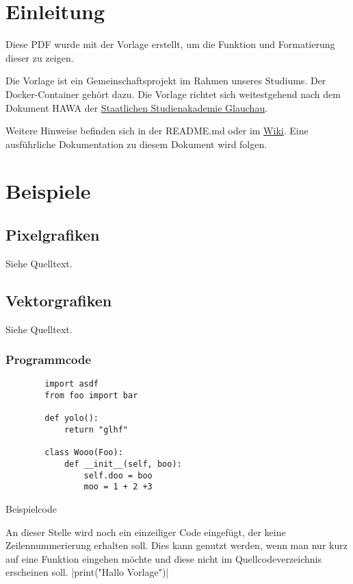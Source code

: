 \section{Einleitung}
Diese PDF wurde mit der Vorlage erstellt, um die Funktion und Formatierung dieser zu zeigen.

Die Vorlage ist ein Gemeinschaftsprojekt im Rahmen unseres Studiums.
Der Docker-Container gehört dazu.
Die Vorlage richtet sich weitestgehend nach dem Dokument \ac{HAWA} der \href{https://www.ba-glauchau.de/}{Staatlichen Studienakademie Glauchau}.

Weitere Hinweise befinden sich in der README.md oder im \href{https://github.com/DSczyrba/Vorlage-Latex/wiki}{Wiki}.
Eine ausführliche Dokumentation zu diesem Dokument wird folgen.

\section{Beispiele}
\label{sec:beispiele}
\subsection{Pixelgrafiken}
Siehe Quelltext.
\subsection{Vektorgrafiken}
Siehe Quelltext.
\subsubsection{Programmcode}
\begin{code}[H]
    \begin{verbatim}
        import asdf
        from foo import bar
        
        def yolo():
            return "glhf"
        
        class Wooo(Foo):
            def __init__(self, boo):
                self.doo = boo
                moo = 1 + 2 +3
    \end{verbatim}
    \caption{Beispielcode}
    \label{code:example}
\end{code}
An dieser Stelle wird noch ein einzeiliger Code eingefügt, der keine Zeilennummerierung erhalten soll.
Dies kann genutzt werden, wenn man nur kurz auf eine Funktion eingehen möchte und diese nicht im Quellcodeverzeichnis erscheinen soll.
|print("Hallo Vorlage")|

